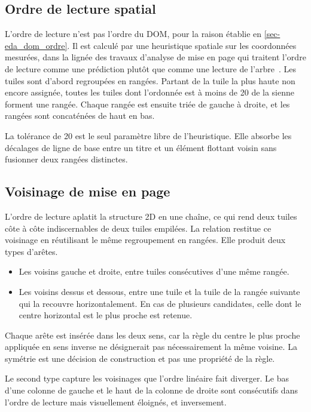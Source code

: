 \subsection{Ordre de lecture spatial}
\label{sec-graphe_ordre}
 
L'ordre de lecture n'est pas l'ordre du DOM, pour la raison établie en
\cref{sec-eda_dom_ordre}. Il est calculé par une heuristique spatiale sur les
coordonnées mesurées, dans la lignée des travaux d'analyse de mise en page qui
traitent l'ordre de lecture comme une prédiction plutôt que comme une lecture de
l'arbre~\citep{layoutreader2021}. Les tuiles sont d'abord regroupées en rangées.
Partant de la tuile la plus haute non encore assignée, toutes les tuiles dont
l'ordonnée est à moins de \SI{20}{\pixel} de la sienne forment une rangée.
Chaque rangée est ensuite triée de gauche à droite, et les rangées sont
concaténées de haut en bas.
 
La tolérance de \SI{20}{\pixel} est le seul paramètre libre de l'heuristique.
Elle absorbe les décalages de ligne de base entre un titre et un élément
flottant voisin sans fusionner deux rangées distinctes.

\subsection{Voisinage de mise en page}
\label{sec-graphe_adjacence}
 
L'ordre de lecture aplatit la structure 2D en une chaîne, ce qui rend deux
tuiles côte à côte indiscernables de deux tuiles empilées. La relation
 restitue ce voisinage en réutilisant le même
regroupement en rangées. Elle produit deux types d'arêtes.
 
\begin{itemize}
\item Les voisins gauche et droite, entre tuiles consécutives d'une même rangée.
\item Les voisins dessus et dessous, entre une tuile et la tuile de la rangée
suivante qui la recouvre horizontalement. En cas de plusieurs candidates, celle
dont le centre horizontal est le plus proche est retenue.
\end{itemize}
 
Chaque arête est insérée dans les deux sens, car la règle du centre le plus
proche appliquée en sens inverse ne désignerait pas nécessairement la même
voisine. La symétrie est une décision de construction et pas une propriété de la
règle.
 
Le second type capture les voisinages que l'ordre linéaire fait diverger. Le bas
d'une colonne de gauche et le haut de la colonne de droite sont consécutifs dans
l'ordre de lecture mais visuellement éloignés, et inversement.

